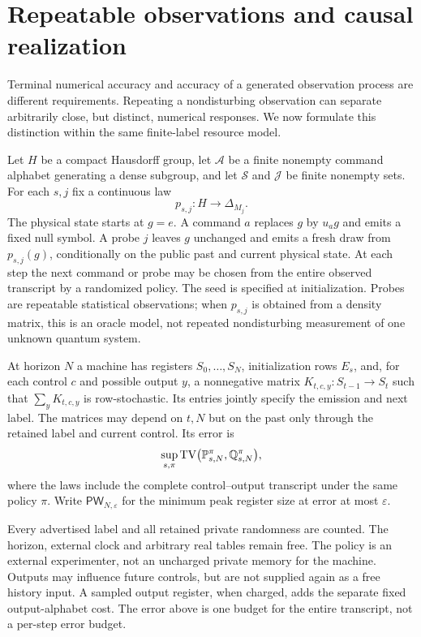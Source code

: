 \section{Repeatable observations and causal realization}\label{sec:causal59}
Terminal numerical accuracy and accuracy of a generated observation process
are different requirements. Repeating a nondisturbing observation can
separate arbitrarily close, but distinct, numerical responses. We now
formulate this distinction within the same finite-label resource model.

Let $H$ be a compact Hausdorff group, let $\mathcal A$ be a finite nonempty
command alphabet generating a dense subgroup, and let $\mathcal S$ and
$\mathcal J$ be finite nonempty sets. For each $s,j$ fix a continuous law
\[
 p_{s,j}:H\longrightarrow\Delta_{M_j}.
\]
The physical state starts at $g=e$. A command $a$ replaces $g$ by $u_ag$
and emits a fixed null symbol. A probe $j$ leaves $g$ unchanged and emits
a fresh draw from $p_{s,j}(g)$, conditionally on the public past
and current physical state. At each step the next command or probe may be chosen from the entire
observed transcript by a randomized policy. The seed is specified at
initialization. Probes are repeatable statistical observations; when
$p_{s,j}$ is obtained from a density matrix, this is an oracle model, not
repeated nondisturbing measurement of one unknown quantum system.

\begin{definition}\label{def:causal59}
At horizon $N$ a machine has registers $S_0,\ldots,S_N$, initialization
rows $E_s$, and, for each control $c$ and possible output $y$, a
nonnegative matrix $K_{t,c,y}:S_{t-1}\to S_t$ such that
$\sum_yK_{t,c,y}$ is row-stochastic. Its entries jointly specify the
emission and next label. The matrices may depend on $t,N$ but on the past
only through the retained label and current control. Its error is
\[
 \sup_{s,\pi}\operatorname{TV}\bigl(\mathbb P^{\pi}_{s,N},
                            \mathbb Q^{\pi}_{s,N}\bigr),
\]
where the laws include the complete control--output transcript under the
same policy $\pi$. Write $\mathsf{PW}_{N,\varepsilon}$ for the minimum
peak register size at error at most $\varepsilon$.
\end{definition}
Every advertised label and all retained private randomness are counted.
The horizon, external clock and arbitrary real tables remain free. The
policy is an external experimenter, not an uncharged private memory for
the machine. Outputs may influence future controls, but are not supplied
again as a free history input. A sampled output register, when charged,
adds the separate fixed output-alphabet cost. The error above is one
budget for the entire transcript, not a per-step error budget.

